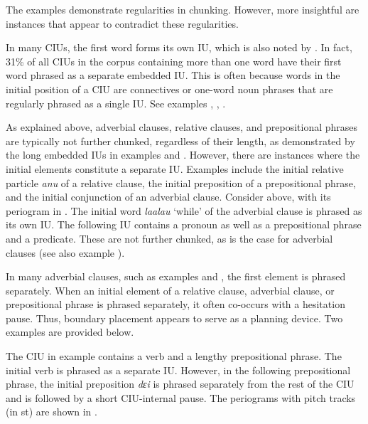 The examples demonstrate regularities in chunking. However, more insightful are instances that appear to contradict these regularities.

In many CIUs, the first word forms its own IU, which is also noted by \citet[361]{Himmelmann_Preliminary_2018}. In fact, 31\% of all CIUs in the corpus containing more than one word have their first word phrased as a separate embedded IU. This is often because words in the initial position of a CIU are connectives or one-word noun phrases that are regularly phrased as a single IU. See examples ,  , .

As  explained above, adverbial clauses, relative clauses, and prepositional phrases are typically not further chunked, regardless of their length, as demonstrated by the long embedded IUs in examples  and . However, there are instances where the initial elements constitute a separate IU. Examples include the initial relative particle \textit{anu} of a relative clause, the initial preposition of a prepositional phrase, and the initial conjunction of an adverbial clause. Consider  above, with its periogram in  . The initial word \textit{laalau}  `while' of the adverbial clause is phrased as its own IU. The following IU contains a pronoun as well as a prepositional phrase and a predicate. These are not further chunked, as is the case for adverbial clauses (see also example ).




In many adverbial clauses, such as examples  and , the first element is phrased separately. When an initial element of a relative clause, adverbial clause, or prepositional phrase is phrased separately, it often co-occurs with a hesitation pause. Thus, boundary placement appears to serve as a planning device. Two examples are provided below.

The CIU in example  contains a verb and a lengthy prepositional phrase. The initial verb is phrased as a separate IU. However, in the following prepositional phrase, the initial preposition \textit{dɛi} is phrased separately from the rest of the CIU and is followed by a short CIU-internal pause. The periograms with pitch tracks (in st) are shown in   .


